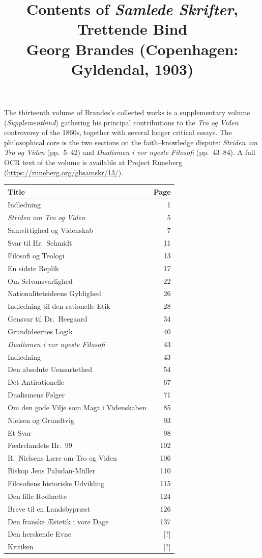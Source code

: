 \documentclass[12pt]{article}
\title{Contents of \textit{Samlede Skrifter}, Trettende Bind\\[0.4em]
  \large Georg Brandes (Copenhagen: Gyldendal, 1903)}
\author{}
\date{}
\begin{document}
\maketitle

\noindent
The thirteenth volume of Brandes's collected works is a supplementary
volume (\textit{Supplementbind}) gathering his principal contributions
to the \textit{Tro og Viden} controversy of the 1860s, together with
several longer critical essays. The philosophical core is the two
sections on the faith--knowledge dispute: \textit{Striden om Tro og
Viden} (pp.~5--42) and \textit{Dualismen i vor nyeste Filosofi}
(pp.~43--84). A full OCR text of the volume is available at
Project Runeberg (\url{https://runeberg.org/gbsamskr/13/}).

\bigskip
\begin{tabular}{p{9cm}r}
\toprule
\textbf{Title} & \textbf{Page} \\
\midrule
Indledning & 1 \\
\midrule
\textit{Striden om Tro og Viden} & 5 \\
\quad Samvittighed og Videnskab & 7 \\
\quad Svar til Hr.\ Schmidt & 11 \\
\quad Filosofi og Teologi & 13 \\
\quad En sidste Replik & 17 \\
\quad Om Selvansvarlighed & 22 \\
\quad Nationalitetsideens Gyldighed & 26 \\
\quad Indledning til den rationelle Etik & 28 \\
\quad Gensvar til Dr.\ Heegaard & 34 \\
\quad Grundideernes Logik & 40 \\
\midrule
\textit{Dualismen i vor nyeste Filosofi} & 43 \\
\quad Indledning & 43 \\
\quad Den absolute Uensartethed & 54 \\
\quad Det Antirationelle & 67 \\
\quad Dualismens F\o{}lger & 71 \\
\midrule
Om den gode Vilje som Magt i Videnskaben & 85 \\
Nielsen og Grundtvig & 93 \\
Et Svar & 98 \\
F\ae{}drelandets Hr.\ 99 & 102 \\
R.\ Nielsens L\ae{}re om Tro og Viden & 106 \\
Biskop Jens Paludan-M\"uller & 110 \\
Filosofiens historiske Udvikling & 115 \\
Den lille R\o{}dh\ae{}tte & 124 \\
Breve til en Landsbypr\ae{}st & 126 \\
\midrule
Den franske \AE{}stetik i vore Dage & 137 \\
Den herskende Evne & [?] \\
Kritiken & [?] \\
\bottomrule
\end{tabular}
\end{document}
